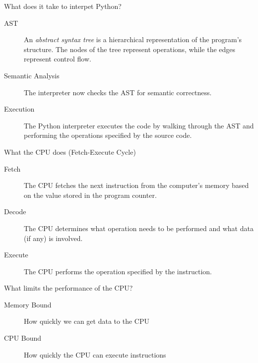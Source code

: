 \documentclass[12pt, aspectration=169]{beamer}
\begin{document}
    \begin{frame}{What does it take to interpet Python?}
        \begin{description}
            \item[AST] An \textit{abstract syntax tree} is a hierarchical representation of the program's structure.
            The nodes of the tree represent operations, while the edges represent control flow.
            \item[Semantic Analysis] The interpreter now checks the AST for semantic correctness.
            \item[Execution] The Python interpreter executes the code by walking through the AST and performing the operations specified by the source code.
        \end{description}
    \end{frame}

    \begin{frame}{What the CPU does (Fetch-Execute Cycle)}
        \begin{description}
            \item[Fetch] The CPU fetches the next instruction from the computer's memory based on the value stored in the program counter.
            \item[Decode] The CPU determines what operation needs to be performed and what data (if any) is involved.
            \item[Execute] The CPU performs the operation specified by the instruction.
        \end{description}
    \end{frame}

    \begin{frame}{What limits the performance of the CPU?}
        \begin{description}
            \item[Memory Bound] How quickly we can get data to the CPU
            \item[CPU Bound] How quickly the CPU can execute instructions
        \end{description}
    \end{frame}
\end{document}
